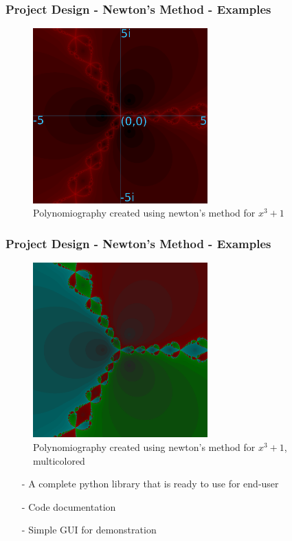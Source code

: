 \documentclass{beamer}
\begin{document}
\begin{contents}
        \frametitle{{\color{white} Project Design - Newton's Method - Examples}}
	\begin{figure}[h]
		\centering
		\caption{Polynomiography created using newton's method for $x^3 + 1$}
		\includegraphics[width=0.6\textwidth]{fig4}
	\end{figure}
\end{contents}

\begin{contents}
        \frametitle{{\color{white} Project Design - Newton's Method - Examples}}
	\begin{figure}[h]
		\centering
		\caption{Polynomiography created using newton's method for $x^3 + 1$, multicolored}
		\includegraphics[width=0.6\textwidth]{fig5}
	\end{figure}
\end{contents}

\begin{projectrequirements}
\begin{itemize}
    \item[-] A complete python library that is ready to use for end-user
    \item[-] Code documentation
    \item[-] Simple GUI for demonstration
\end{itemize}
\end{projectrequirements}
\end{document}
